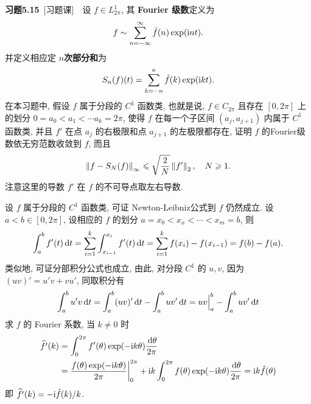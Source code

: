\textbf{习题5.15}\ [习题课]\ \ 设 $ f\in L_{2\pi}^{1} $, 其 \textbf{Fourier 级数}定义为
	\[
		f\sim \sum_{n=-\infty}^{\infty}\hat{f}(n)\exp(\mathrm{i} nt).
	\]
	并定义相应定 $ n $\textbf{次部分和}为
	\[
		S_{n}(f)(t)=\sum_{k = -n}^{n}\hat{f}(k)\exp(\mathrm{i} kt).
	\]
	在本习题中, 假设 $ f $ 属于分段的 $ C^{1} $ 函数类, 也就是说, $ f\in C_{2\pi} $ 且存在 $ [0, 2\pi] $ 上的划分 $ 0=a_{0}<a_{1}<\cdots a_{k}=2\pi $, 使得 $ f $ 在每一个子区间 $ (a_{j}, a_{j+1}) $ 内属于 $ C^{1} $ 函数类, 并且 $ f' $ 在点 $ a_{j} $ 的右极限和点 $ a_{j+1} $ 的左极限都存在, 证明 $ f $ 的Fourier级数依无穷范数收敛到 $ f $, 而且
	\[
		\left\| f-S_{N}(f) \right\|_{\infty}\leqslant\sqrt{\frac{2}{N}}\left\| f' \right\|_{2}, \quad N\geqslant1.
	\]
	注意这里的导数 $ f' $ 在 $ f $ 的不可导点取左右导数. 
	\begin{Proof}
		设 $ f $ 属于分段的 $ C^{1} $ 函数类, 可证 Newton-Leibniz公式到 $ f $ 仍然成立. 设 $ a<b\in[0, 2\pi] $, 设相应的 $ f $ 的划分 $ a=x_{0}<x_{x}<\cdots<x_{m}=b $, 则
		\[
			\int_{a}^{b}f'(t)\,\mathrm{d} t=\sum_{i=1}^{k}\int_{x_{i-1}}^{x_{i}}f'(t)\,\mathrm{d} t=\sum_{i=1}^{k}f(x_{i})-f(x_{i-1})=f(b)-f(a).
		\]
		类似地, 可证分部积分公式也成立, 由此, 对分段 $ C^{1} $ 的 $ u, v $, 因为 $ (uv)'=u'v+vu' $, 同取积分有
		\[
			\int_{a}^{b}u'v\,\mathrm{d} t=\int_{a}^{b}(uv)'\,\mathrm{d} t-\int_{a}^{b}uv'\,\mathrm{d} t=uv\Big|_{a}^{b}-\int_{a}^{b}uv'\,\mathrm{d} t
		\]
		求 $ f $ 的 Fourier 系数, 当 $ k\ne0 $ 时
		\[
			\begin{aligned}
				\widehat{f'}(k) & =\int_{0}^{2\pi}f'(\theta)\exp(-\mathrm{i} k\theta)\frac{\,\mathrm{d} \theta}{2\pi} \\
				& = \frac{f(\theta)\exp(-\mathrm{i} k\theta)}{2\pi}\bigg|_{0}^{2\pi}+\mathrm{i} k\int_{0}^{2\pi}f(\theta)\exp(-\mathrm{i} k\theta)\frac{\,\mathrm{d} \theta}{2\pi} = \mathrm{i} k\hat{f}(\theta)
			\end{aligned}
		\]
		即 $ \widehat{f'}(k)=-\mathrm{i} \hat{f}(k)/k $.


\end{Proof}
